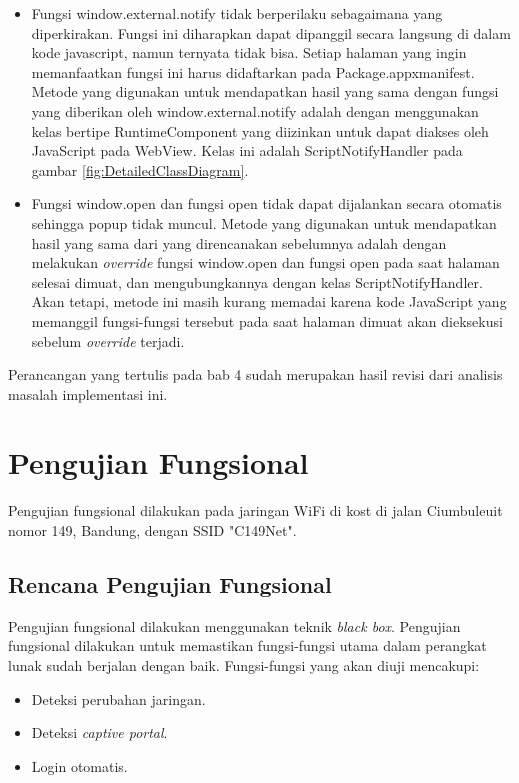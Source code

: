\begin{itemize}
    \item{Fungsi window.external.notify tidak berperilaku sebagaimana yang diperkirakan. Fungsi ini diharapkan dapat dipanggil secara langsung di dalam kode javascript, namun ternyata tidak bisa. Setiap halaman yang ingin memanfaatkan fungsi ini harus didaftarkan pada Package.appxmanifest. Metode yang digunakan untuk mendapatkan hasil yang sama dengan fungsi yang diberikan oleh window.external.notify adalah dengan menggunakan kelas bertipe RuntimeComponent yang diizinkan untuk dapat diakses oleh JavaScript pada WebView. Kelas ini adalah ScriptNotifyHandler pada gambar \ref{fig:DetailedClassDiagram}.}
    \item{Fungsi window.open dan fungsi open tidak dapat dijalankan secara otomatis sehingga popup tidak muncul. Metode yang digunakan untuk mendapatkan hasil yang sama dari yang direncanakan sebelumnya adalah dengan melakukan \textit{override} fungsi window.open dan fungsi open pada saat halaman selesai dimuat, dan mengubungkannya dengan kelas ScriptNotifyHandler. Akan tetapi, metode ini masih kurang memadai karena kode JavaScript yang memanggil fungsi-fungsi tersebut pada saat halaman dimuat akan dieksekusi sebelum \textit{override} terjadi.}
\end{itemize}

Perancangan yang tertulis pada bab 4 sudah merupakan hasil revisi dari analisis masalah implementasi ini.



\section{Pengujian Fungsional}
\label{sec:pengujian_fungsional}

Pengujian fungsional dilakukan pada jaringan WiFi di kost di jalan Ciumbuleuit nomor 149, Bandung, dengan SSID "C149Net".

\subsection{Rencana Pengujian Fungsional}
\label{subsec:rencana_pengujian_fungsional}

Pengujian fungsional dilakukan menggunakan teknik \textit{black box}. Pengujian fungsional dilakukan untuk memastikan fungsi-fungsi utama dalam perangkat lunak sudah berjalan dengan baik. Fungsi-fungsi yang akan diuji mencakupi:

\begin{itemize}
    \item{Deteksi perubahan jaringan.}
    \item{Deteksi \textit{captive portal}.}
    \item{Login otomatis.}
\end{itemize}

